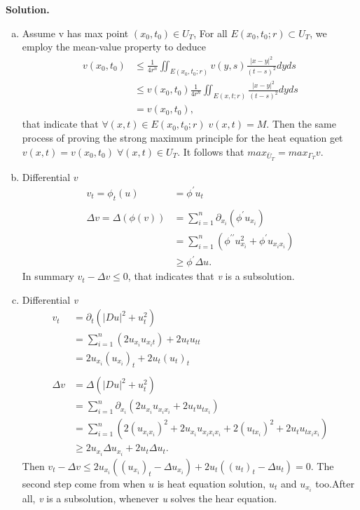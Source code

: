 \documentclass[a4paper]{book}
\newenvironment{solution}%
{\noindent\textbf{Solution.}}%
{\qedhere}
\numberwithin{equation}{chapter}
\theoremstyle{definition}
\begin{document}
\begin{multicols}{2}
\begin{solution}
\begin{enumerate}[(a)]
		\item Assume v has max point $ (x_0, t_0) \in U_T $, For all $ E(x_0,t_0;r) \subset U_T $, we employ the mean-value property to deduce 
		\begin{align*}
			v(x_0,t_0) &\leq \frac{1}{4r^n} \iint_{E(x_0,t_0;r)} v(y,s) \frac{|x-y|^2}{(t-s)^2}dyds \\
			&\leq v(x_0,t_0) \frac{1}{4r^n} \iint_{E(x,t;r)} \frac{|x-y|^2}{(t-s)^2}dyds \\
			&= v(x_0,t_0),
		\end{align*}
		that indicate that $ \forall (x,t) \in E(x_0, t_0;r) \; v(x,t) = M $. Then the same process of proving the strong maximum principle for the heat equation get $ v(x,t) = v(x_0,t_0) \; \forall (x,t) \in U_T $. It follows that $ max_{\bar{U}_T} = max_{\Gamma_T} v. $
		
		\item Differential $ v $
		\begin{align*}
			v_t = \phi_t(u) &= \phi^\prime u_t \\
			&\\
			\Delta v = \Delta(\phi(v)) &= \sum_{i=1}^{n}\partial_{x_i} (\phi^\prime u_{x_i}) \\
			&=\sum_{i=1}^{n}(\phi^{\prime \prime} u_{x_i}^2 + \phi^\prime u_{x_i x_i}) \\
			&\geq \phi^\prime \Delta u.
		\end{align*}
		In summary $ v_t - \Delta v \leq 0 $, that indicates that \textit{v} is a subsolution.
		
		\item Differential \textit{v} 
		\begin{align*}
			v_t &= \partial_t (|Du|^2 + u^2_t) \\
			&= \sum_{i = 1}^{n}(2 u_{x_i} u_{x_i t}) + 2 u_t u_{tt} \\
			&= 2u_{x_i} (u_{x_i})_t + 2 u_t (u_t)_t \\
			&\\
			\Delta v &= \Delta(|Du|^2 + u^2_t) \\
			&= \sum_{i=1}^{n} \partial_{x_i}(2 u_{x_i} u_{x_i x_i} + 2 u_t u_{t x_i}) \\
			&= \sum_{i=1}^{n} (2(u_{x_i x_i})^2 + 2 u_{x_i} u_{x_i x_i x_i} + 2(u_{t x_i})^2 + 2u_t u_{t x_i x_i}) \\
			&\geq 2u_{x_i} \Delta u_{x_i} + 2u_t \Delta u_{t}.
		\end{align*} 
		Then $ v_t - \Delta v \leq 2u_{x_i}((u_{x_i})_t - \Delta u_{x_i}) + 2u_t((u_t)_t - \Delta u_t) = 0 $. The second step come from when $ u $ is heat equation solution, $ u_t $  and $ u_{x_i} $ too.After all, \textit{v} is a subsolution, whenever \textit{u} solves the hear equation.
	\end{enumerate}
\end{solution}
%


\end{multicols}
\end{document}

